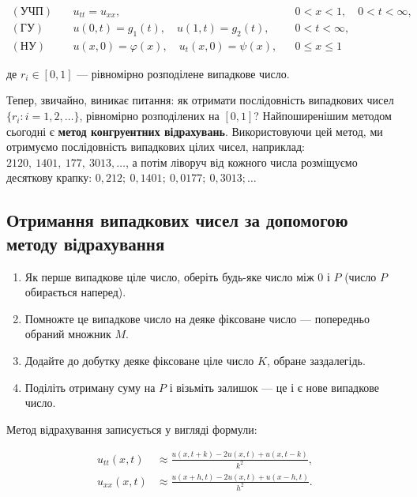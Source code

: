 \documentclass[
  ukrainian,
]{article}
\providecommand{\tightlist}{%
  \setlength{\itemsep}{0pt}\setlength{\parskip}{0pt}}
\begin{document}
\[
\begin{aligned}(\text{УЧП})\quad & u_{tt}=u_{xx}, && 0<x<1,\quad 0<t<\infty,\\(\text{ГУ})\quad & u(0,t)=g_1(t),\quad u(1,t)=g_2(t), && 0<t<\infty,\\(\text{НУ})\quad & u(x,0)=\varphi(x),\quad u_t(x,0)=\psi(x), && 0\le x\le 1\end{aligned}
\]

де \(r_i \in [0, 1]\) --- рівномірно розподілене випадкове число.

Тепер, звичайно, виникає питання: як отримати послідовність випадкових
чисел \(\{r_i: i=1,2,\ldots\}\), рівномірно розподілених на \([0,1]\)?
Найпоширенішим методом сьогодні є \textbf{метод конгруентних
відрахувань}. Використовуючи цей метод, ми отримуємо послідовність
випадкових цілих чисел, наприклад: \(2120,\ 1401,\ 177,\ 3013, \ldots\),
а потім ліворуч від кожного числа розміщуємо десяткову крапку:
\(0{,}212;\ 0{,}1401;\ 0{,}0177;\ 0{,}3013; \ldots\)

\subsection{Отримання випадкових чисел за допомогою методу
відрахування}\label{ux43eux442ux440ux438ux43cux430ux43dux43dux44f-ux432ux438ux43fux430ux434ux43aux43eux432ux438ux445-ux447ux438ux441ux435ux43b-ux437ux430-ux434ux43eux43fux43eux43cux43eux433ux43eux44e-ux43cux435ux442ux43eux434ux443-ux432ux456ux434ux440ux430ux445ux443ux432ux430ux43dux43dux44f}

\begin{enumerate}
\def\labelenumi{\arabic{enumi}.}
\tightlist
\item
  Як перше випадкове ціле число, оберіть будь-яке число між \(0\) і
  \(P\) (число \(P\) обирається наперед).
\item
  Помножте це випадкове число на деяке фіксоване число --- попередньо
  обраний множник \(M\).
\item
  Додайте до добутку деяке фіксоване ціле число \(K\), обране
  заздалегідь.
\item
  Поділіть отриману суму на \(P\) і візьміть залишок --- це і є нове
  випадкове число.
\end{enumerate}

Метод відрахування записується у вигляді формули:

\[
\begin{aligned}u_{tt}(x,t)&\approx \frac{u(x,t+k)-2u(x,t)+u(x,t-k)}{k^2},\\u_{xx}(x,t)&\approx \frac{u(x+h,t)-2u(x,t)+u(x-h,t)}{h^2}.\end{aligned}
\]
\end{document}
